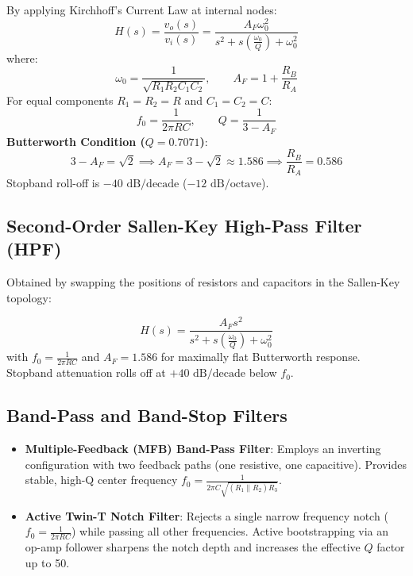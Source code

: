 \documentclass[12pt,a4paper]{article}
\begin{document}
\begin{tcolorbox}[formulabox, title={2nd-Order Sallen-Key LPF Transfer Function and Design Equations}]
By applying Kirchhoff's Current Law at internal nodes:
\begin{equation}
  H(s) = \frac{v_o(s)}{v_i(s)} = \frac{A_F \omega_0^2}{s^2 + s \left(\frac{\omega_0}{Q}\right) + \omega_0^2}
\end{equation}
where:
\begin{equation}
  \omega_0 = \frac{1}{\sqrt{R_1 R_2 C_1 C_2}}, \qquad A_F = 1 + \frac{R_B}{R_A}
\end{equation}
For equal components $R_1 = R_2 = R$ and $C_1 = C_2 = C$:
\begin{equation}
  f_0 = \frac{1}{2\pi R C}, \qquad Q = \frac{1}{3 - A_F}
\end{equation}
\textbf{Butterworth Condition ($Q = 0.7071$)}:
\begin{equation}
  3 - A_F = \sqrt{2} \implies A_F = 3 - \sqrt{2} \approx 1.586 \implies \frac{R_B}{R_A} = 0.586
\end{equation}
Stopband roll-off is $-40\text{ dB/decade}$ ($-12\text{ dB/octave}$).
\end{tcolorbox}

\subsection{Second-Order Sallen-Key High-Pass Filter (HPF)}
Obtained by swapping the positions of resistors and capacitors in the Sallen-Key topology:
\begin{tcolorbox}[formulabox, title={2nd-Order Sallen-Key HPF Transfer Function}]
\begin{equation}
  H(s) = \frac{A_F s^2}{s^2 + s \left(\frac{\omega_0}{Q}\right) + \omega_0^2}
\end{equation}
with $f_0 = \frac{1}{2\pi R C}$ and $A_F = 1.586$ for maximally flat Butterworth response. Stopband attenuation rolls off at $+40\text{ dB/decade}$ below $f_0$.
\end{tcolorbox}

\subsection{Band-Pass and Band-Stop Filters}
\begin{itemize}[leftmargin=12pt, itemsep=3pt, topsep=2pt]
  \item \textbf{Multiple-Feedback (MFB) Band-Pass Filter}: Employs an inverting configuration with two feedback paths (one resistive, one capacitive). Provides stable, high-Q center frequency $f_0 = \frac{1}{2\pi C \sqrt{(R_1 \parallel R_2) R_3}}$.
  \item \textbf{Active Twin-T Notch Filter}: Rejects a single narrow frequency notch ($f_0 = \frac{1}{2\pi R C}$) while passing all other frequencies. Active bootstrapping via an op-amp follower sharpens the notch depth and increases the effective $Q$ factor up to 50.
\end{itemize}
\end{document}

